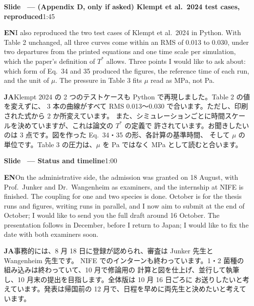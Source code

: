 \documentclass[11pt,a4paper]{article}
\newcounter{sl}
\newcommand{\slide}[2]{\stepcounter{sl}\vspace{8pt}%
  {\color{c3}\large\bfseries Slide \thesl\ --- #1}\hfill{\small #2}\par\vspace{2pt}}
\newcommand{\EN}{\textbf{EN}\quad}
\newcommand{\JA}{\par\textbf{JA}\quad}
\begin{document}
\slide{(Appendix D, only if asked) Klempt et al.\ 2024 test cases, reproduced}{1:45}
\EN I also reproduced the two test cases of Klempt et al.\ 2024 in Python.
With Table 2 unchanged, all three curves come within an RMS of 0.013 to 0.030, under
two departures from the printed equations and one time scale per
simulation, which the paper's definition of $T^*$ allows. Three points I
would like to ask about: which form of Eq.\ 34 and 35 produced the figures,
the reference time of each run, and the unit of $\mu$. The pressure in
Table 3 fits $\mu$ read as MPa, not Pa.
\JA Klempt 2024 の 2 つのテストケースも Python で再現しました。Table 2 の値を変えずに、
3 本の曲線がすべて RMS 0.013〜0.030 で合います。ただし、印刷された式から 2 か所変えています。
また、シミュレーションごとに時間スケールを決めていますが、これは論文の $T^*$ の定義で
許されています。お聞きしたいのは 3 点です。図を作った Eq.\ 34・35 の形、各計算の基準時間、
そして $\mu$ の単位です。Table 3 の圧力は、$\mu$ を Pa ではなく MPa として読むと合います。

\slide{Status and timeline}{1:00}
\EN On the administrative side, the admission was granted on 18 August, with
Prof.\ Junker and Dr.\ Wangenheim as examiners, and the internship at NIFE is
finished. The coupling for one and two species is done. October is for the
thesis runs and figures, writing runs in parallel, and I now aim to submit
at the end of October; I would like to send you the full draft around
16 October. The presentation follows in
December, before I return to Japan; I would like to fix the date with both
examiners soon.
\JA 事務的には、8 月 18 日に登録が認められ、審査は Junker 先生と Wangenheim 先生です。
NIFE でのインターンも終わっています。1・2 菌種の組み込みは終わっていて、10 月で修論用の
計算と図を仕上げ、並行して執筆し、10 月末の提出を目指します。全体版は 10 月 16 日ごろに
お送りしたいと考えています。発表は帰国前の
12 月で、日程を早めに両先生と決めたいと考えています。
\end{document}
